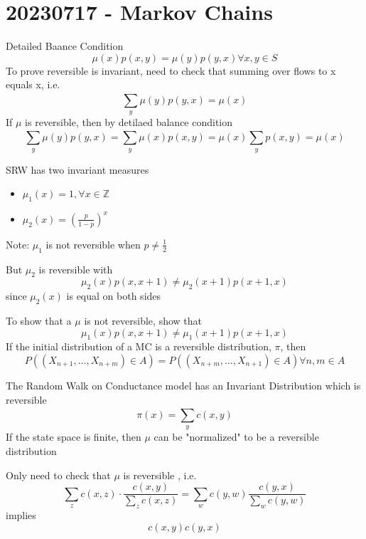\documentclass{report}
\begin{document}


\chapter{20230717 - Markov Chains}%
  Detailed Baance Condition
    \[\mu(x)p(x,y) = \mu(y)p(y,x) \forall x,y \in S \]
  To prove reversible is invariant, need to check that summing over flows
  to x equals x, i.e.
    \[ \sum^{}_{y} \mu(y)p(y,x) = \mu(x) \]
    If $\mu$ is reversible, then by detilaed balance condition
    \[ \sum^{}_{y} \mu(y)p(y,x) = \sum^{}_{y} \mu(x)p(x,y) = \mu(x) \sum^{}_{y} p(x,y) = \mu(x)  \]

    SRW has two invariant measures
    \begin{itemize}
      \item $\mu_1(x) = 1, \forall x \in \mathbb{Z} $
      \item $\mu_2(x) = \left( \frac{p}{1-p}  \right)^x$
    \end{itemize}
    Note: $\mu_1$ is not reversible when $p \neq \frac{1}{2} $
    
    But $\mu_2$ is reversible with
    \[ \mu_2(x)p(x,x+1) \neq \mu_2(x+1) p(x+1,x) \]
    since $\mu_2(x)$ is equal on both sides
    
    

    To show that a $\mu$ is not reversible, show that
    \[ \mu_1(x)p(x,x+1) \neq \mu_1(x+1) p(x+1,x) \]
    \thm{  } {
      If the initial distribution of a MC is a reversible distribution,
      $\pi$, then
      \[ P((X_{n+1}, \dots, X_{n+m}) \in A) = P((X_{n+m}, \dots, X_{n+1}) \in A) \forall n,m \in A \]
    }
     {
      The Random Walk on Conductance model has an Invariant Distribution
      which is reversible
        \[ \pi(x) = \sum^{}_{y} c(x,y) \]
        If the state space is finite, then $\mu$ can be "normalized"
        to be a reversible distribution

        Only need to check that $\mu$ is reversible , i.e.
      \[ \sum_{z}c(x,z) \cdot \frac{c(x,y)}{\sum_{z}c(x,z)} = \sum_{w}c(y,w) \frac{c(y,x)}{\sum_{w} c(y,w) } \]
            implies
        \[ c(x,y) c(y,x) \]
    }
\end{document}
